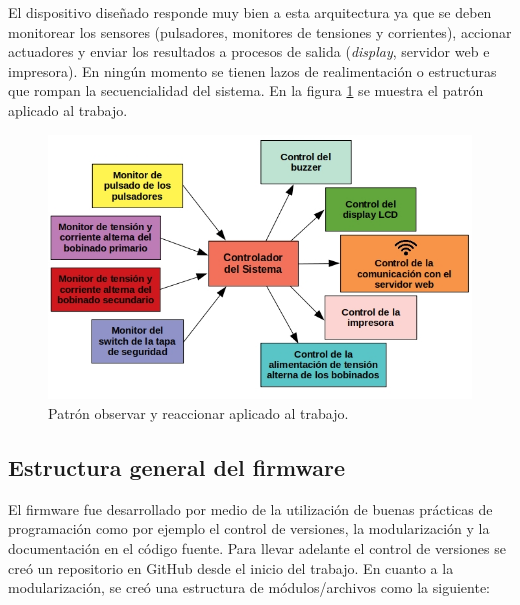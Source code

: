 El dispositivo diseñado responde muy bien a esta arquitectura ya que se deben monitorear los sensores (pulsadores, monitores de tensiones y corrientes), accionar actuadores y enviar los resultados a procesos de salida (\textit{display}, servidor web e impresora). En ningún momento se tienen lazos de realimentación o estructuras que rompan la secuencialidad del sistema. En la figura \ref{fig:patronAplicado} se muestra el patrón aplicado al trabajo.

\begin{figure}[htpb]
	\centering
	\includegraphics[scale=0.55]{./Figures/arquitecturaSoft.jpg}
	\caption{Patrón observar y reaccionar aplicado al trabajo.}
	\label{fig:patronAplicado}
\end{figure}



\subsection{Estructura general del firmware}

El firmware fue desarrollado por medio de la utilización de buenas prácticas de programación como por ejemplo el control de versiones, la modularización y la documentación en el código fuente. Para llevar adelante el control de versiones se creó un repositorio en GitHub \citep{TP_CESE} desde el inicio del trabajo. En cuanto a la modularización, se creó una estructura de módulos/archivos como la siguiente:


